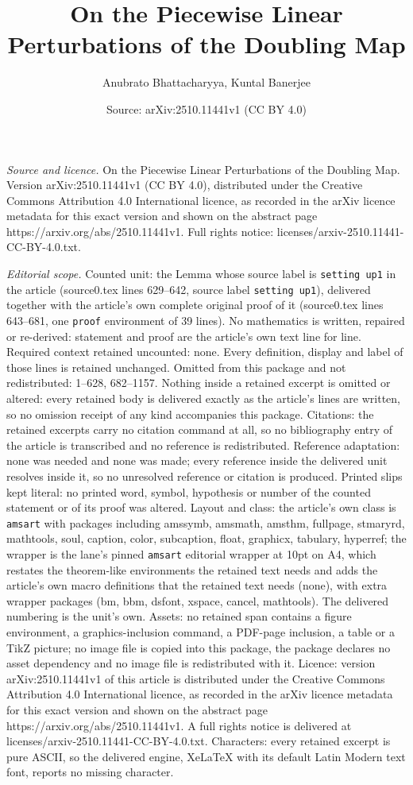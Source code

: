 \documentclass[10pt,a4paper]{amsart}
\title[On the Piecewise Linear Perturbations of the Doubling Map]{On the Piecewise Linear Perturbations of the Doubling Map}
\author{Anubrato Bhattacharyya, Kuntal Banerjee}
\date{Source: arXiv:2510.11441v1 (CC BY 4.0)}
\begin{document}
\maketitle

\noindent\emph{Source and licence.} On the Piecewise Linear Perturbations of the Doubling Map. Version arXiv:2510.11441v1 (CC BY 4.0), distributed under the Creative Commons Attribution 4.0 International licence, as recorded in the arXiv licence metadata for this exact version and shown on the abstract page https://arxiv.org/abs/2510.11441v1. Full rights notice: licenses/arxiv-2510.11441-CC-BY-4.0.txt.\par\smallskip

\noindent\textit{Editorial scope.} Counted unit: the Lemma whose source label is \texttt{setting up1} in the article (source0.tex lines 629--642, source label \texttt{setting up1}), delivered together with the article's own complete original proof of it (source0.tex lines 643--681, one \texttt{proof} environment of 39 lines). No mathematics is written, repaired or re-derived: statement and proof are the article's own text line for line. Required context retained uncounted: none. Every definition, display and label of those lines is retained unchanged. Omitted from this package and not redistributed: 1--628, 682--1157. Nothing inside a retained excerpt is omitted or altered: every retained body is delivered exactly as the article's lines are written, so no omission receipt of any kind accompanies this package. Citations: the retained excerpts carry no citation command at all, so no bibliography entry of the article is transcribed and no reference is redistributed. Reference adaptation: none was needed and none was made; every reference inside the delivered unit resolves inside it, so no unresolved reference or citation is produced. Printed slips kept literal: no printed word, symbol, hypothesis or number of the counted statement or of its proof was altered. Layout and class: the article's own class is \texttt{amsart} with packages including amssymb, amsmath, amsthm, fullpage, stmaryrd, mathtools, soul, caption, color, subcaption, float, graphicx, tabulary, hyperref; the wrapper is the lane's pinned \texttt{amsart} editorial wrapper at 10pt on A4, which restates the theorem-like environments the retained text needs and adds the article's own macro definitions that the retained text needs (none), with extra wrapper packages (bm, bbm, dsfont, xspace, cancel, mathtools). The delivered numbering is the unit's own. Assets: no retained span contains a figure environment, a graphics-inclusion command, a PDF-page inclusion, a table or a TikZ picture; no image file is copied into this package, the package declares no asset dependency and no image file is redistributed with it. Licence: version arXiv:2510.11441v1 of this article is distributed under the Creative Commons Attribution 4.0 International licence, as recorded in the arXiv licence metadata for this exact version and shown on the abstract page https://arxiv.org/abs/2510.11441v1. A full rights notice is delivered at licenses/arxiv-2510.11441-CC-BY-4.0.txt. Characters: every retained excerpt is pure ASCII, so the delivered engine, XeLaTeX with its default Latin Modern text font, reports no missing character.
\end{document}
